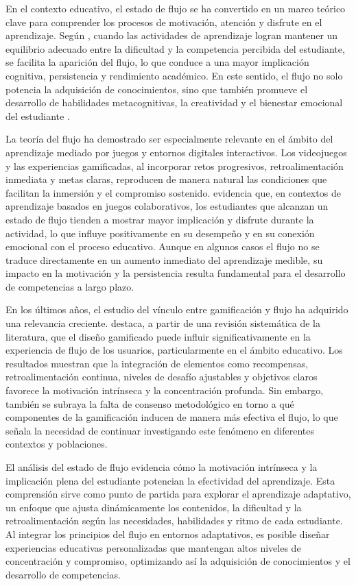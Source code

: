 En el contexto educativo, el estado de flujo se ha convertido en un marco teórico clave para comprender los procesos de motivación, atención y disfrute en el aprendizaje. Según \textcite{Schmidt_2010}, cuando las actividades de aprendizaje logran mantener un equilibrio adecuado entre la dificultad y la competencia percibida del estudiante, se facilita la aparición del flujo, lo que conduce a una mayor implicación cognitiva, persistencia y rendimiento académico. En este sentido, el flujo no solo potencia la adquisición de conocimientos, sino que también promueve el desarrollo de habilidades metacognitivas, la creatividad y el bienestar emocional del estudiante \cite{Csikszentmihalyi_2008}.

La teoría del flujo ha demostrado ser especialmente relevante en el ámbito del aprendizaje mediado por juegos y entornos digitales interactivos. Los videojuegos y las experiencias gamificadas, al incorporar retos progresivos, retroalimentación inmediata y metas claras, reproducen de manera natural las condiciones que facilitan la inmersión y el compromiso sostenido. \textcite{Admiraal} evidencia que, en contextos de aprendizaje basados en juegos colaborativos, los estudiantes que alcanzan un estado de flujo tienden a mostrar mayor implicación y disfrute durante la actividad, lo que influye positivamente en su desempeño y en su conexión emocional con el proceso educativo. Aunque en algunos casos el flujo no se traduce directamente en un aumento inmediato del aprendizaje medible, su impacto en la motivación y la persistencia resulta fundamental para el desarrollo de competencias a largo plazo.

En los últimos años, el estudio del vínculo entre gamificación y flujo ha adquirido una relevancia creciente. \textcite{Oliveira_Pastushenko_Rodrigues_Toda_Palomino_Hamari_Isotani_2021} destaca, a partir de una revisión sistemática de la literatura, que el diseño gamificado puede influir significativamente en la experiencia de flujo de los usuarios, particularmente en el ámbito educativo. Los resultados muestran que la integración de elementos como recompensas, retroalimentación continua, niveles de desafío ajustables y objetivos claros favorece la motivación intrínseca y la concentración profunda. Sin embargo, también se subraya la falta de consenso metodológico en torno a qué componentes de la gamificación inducen de manera más efectiva el flujo, lo que señala la necesidad de continuar investigando este fenómeno en diferentes contextos y poblaciones.

El análisis del estado de flujo evidencia cómo la motivación intrínseca y la implicación plena del estudiante potencian la efectividad del aprendizaje. Esta comprensión sirve como punto de partida para explorar el aprendizaje adaptativo, un enfoque que ajusta dinámicamente los contenidos, la dificultad y la retroalimentación según las necesidades, habilidades y ritmo de cada estudiante. Al integrar los principios del flujo en entornos adaptativos, es posible diseñar experiencias educativas personalizadas que mantengan altos niveles de concentración y compromiso, optimizando así la adquisición de conocimientos y el desarrollo de competencias.



